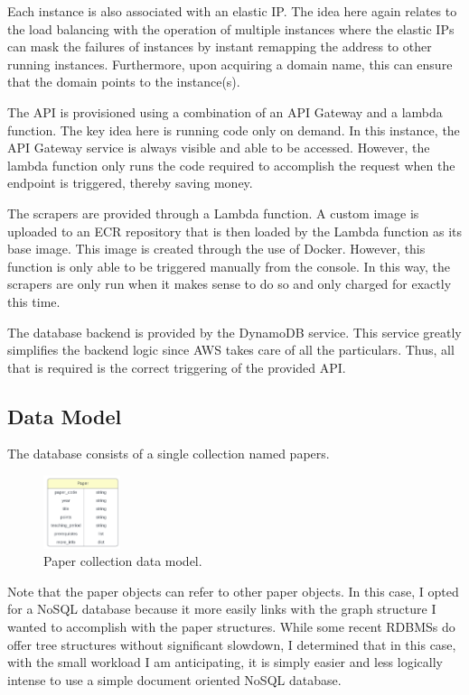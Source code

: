 \documentclass[12pt]{article}
\begin{document}
Each instance is also associated with an elastic IP. The idea here again relates to the load balancing with the operation of multiple instances where the elastic IPs can mask the failures of instances by instant remapping the address to other running instances. Furthermore, upon acquiring a domain name, this can ensure that the domain points to the instance(s).

The API is provisioned using a combination of an API Gateway and a lambda function. The key idea here is running code only on demand. In this instance, the API Gateway service is always visible and able to be accessed. However, the lambda function only runs the code required to accomplish the request when the endpoint is triggered, thereby saving money.   

The scrapers are provided through a Lambda function. A custom image is uploaded to an ECR repository that is then loaded by the Lambda function as its base image. This image is created through the use of Docker. However, this function is only able to be triggered manually from the console. In this way, the scrapers are only run when it makes sense to do so and only charged for exactly this time.

The database backend is provided by the DynamoDB service. This service greatly simplifies the backend logic since AWS takes care of all the particulars. Thus, all that is required is the correct triggering of the provided API. 

\subsection{Data Model}
The database consists of a single collection named papers.

\begin{figure}
    \caption{Paper collection data model.}
    \label{fig: paper_data_model}
    \begin{center}
        \includegraphics[width=0.2\textwidth]{../docs-assets/paper_erd.PNG}
    \end{center}
\end{figure}

Note that the paper objects can refer to other paper objects. In this case, I opted for a NoSQL database because it more easily links with the graph structure I wanted to accomplish with the paper structures. While some recent RDBMSs do offer tree structures without significant slowdown, I determined that in this case, with the small workload I am anticipating, it is simply easier and less logically intense to use a simple document oriented NoSQL database.
\end{document}
